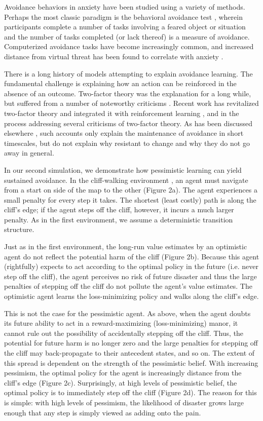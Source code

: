 \documentclass[11pt]{article} %
\begin{document}
Avoidance behaviors in anxiety have been studied using a variety of methods. Perhaps
the most classic paradigm is the behavioral avoidance test \citep{bandura1977}, wherein participants
complete a number of tasks involving a feared object or situation and the number of
tasks completed (or lack thereof) is a measure of avoidance. Computerized avoidance
tasks have become increasingly common, and increased distance from virtual threat
has been found to correlate with anxiety \citep{Bach2014, Bach2017, Sheynin2014}.

There is a long history of models attempting to explain avoidance learning. The
fundamental challenge is explaining how an action can be reinforced in the
absence of an outcome. Two-factor theory was the explanation for a long while,
but suffered from a number of noteworthy criticisms \citep{Krypotos2015}.
Recent work has revitalized two-factor theory and integrated it with reinforcement
learning \citep{Moutoussis2008, Maia2010}, and in the process addressing several
criticisms of two-factor theory. As has been discussed elsewhere \citep{Moutoussis2017},
such accounts only explain the maintenance of avoidance in short timescales, but
do not explain why resistant to change and why they do not go away in general.

In our second simulation, we demonstrate how pessimistic learning can yield
sustained avoidance. In the cliff-walking environment \citep{SuttonBarto1998,
SuttonBarto2018, Gaskett2003}, an agent must navigate from a start on side of the
map to the other (Figure 2a). The agent experiences a small penalty for every
step it takes. The shortest (least costly) path is along the cliff's edge; if the
agent steps off the cliff, however, it incurs a much larger penalty. As in the first
environment, we assume a deterministic transition structure.

Just as in the first environment, the long-run value estimates by an optimistic
agent do not reflect the potential harm of the cliff (Figure 2b). Because this agent (rightfully)
expects to act according to the optimal policy in the future (i.e. never step off
the cliff), the agent perceives no risk of future disaster and thus the large
penalties of stepping off the cliff do not pollute the agent's value estimates.
The optimistic agent learns the loss-minimizing policy and walks along the cliff's edge.

This is not the case for the pessimistic agent. As above, when the agent doubts
its future ability to act in a reward-maximizing (loss-minimizing) manor, it
cannot rule out the possibility of accidentally stepping off the cliff. Thus,
the potential for future harm is no longer zero and the large penalties for stepping
off the cliff may back-propagate to their antecedent states, and so on. The extent
of this spread is dependent on the strength of the pessimistic belief.
With increasing pessimism, the optimal policy for the agent is increasingly
distance from the cliff's edge (Figure 2c). Surprisingly, at high levels of pessimistic
belief, the optimal policy is to immediately step off the cliff (Figure 2d). The
reason for this is simple: with high levels of pessimism, the likelihood of disaster
grows large enough that any step is simply viewed as adding onto the pain.
\end{document}
